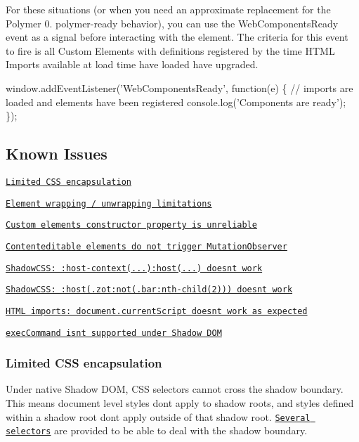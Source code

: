 For these situations (or when you need an approximate replacement for the Polymer 0. {\ttfamily polymer-\/ready} behavior), you can use the {\ttfamily Web\+Components\+Ready} event as a signal before interacting with the element. The criteria for this event to fire is all Custom Elements with definitions registered by the time H\+T\+ML Imports available at load time have loaded have upgraded.


\begin{DoxyCode}
window.addEventListener('WebComponentsReady', function(e) \{
  // imports are loaded and elements have been registered
  console.log('Components are ready');
\});
\end{DoxyCode}


\subsection*{Known Issues}


\begin{DoxyItemize}
\item \href{#encapsulation}{\tt Limited C\+SS encapsulation}
\item \href{#wrapping}{\tt Element wrapping / unwrapping limitations}
\item \href{#constructor}{\tt Custom element\textquotesingle{}s constructor property is unreliable}
\item \href{#contentedit}{\tt Contenteditable elements do not trigger Mutation\+Observer}
\item \href{#hostcontext}{\tt Shadow\+C\+S\+S\+: \+:host-\/context(...)\+:host(...) doesn\textquotesingle{}t work}
\item \href{#nestedparens}{\tt Shadow\+C\+S\+S\+: \+:host(.zot\+:not(.bar\+:nth-\/child(2))) doesn\textquotesingle{}t work}
\item \href{#currentscript}{\tt H\+T\+ML imports\+: document.\+current\+Script doesn\textquotesingle{}t work as expected}
\item \href{#execcommand}{\tt exec\+Command isn\textquotesingle{}t supported under Shadow D\+OM}
\end{DoxyItemize}

\subsubsection*{Limited C\+SS encapsulation }

Under native Shadow D\+OM, C\+SS selectors cannot cross the shadow boundary. This means document level styles don\textquotesingle{}t apply to shadow roots, and styles defined within a shadow root don\textquotesingle{}t apply outside of that shadow root. \href{http://www.html5rocks.com/en/tutorials/webcomponents/shadowdom-201/}{\tt Several selectors} are provided to be able to deal with the shadow boundary.

